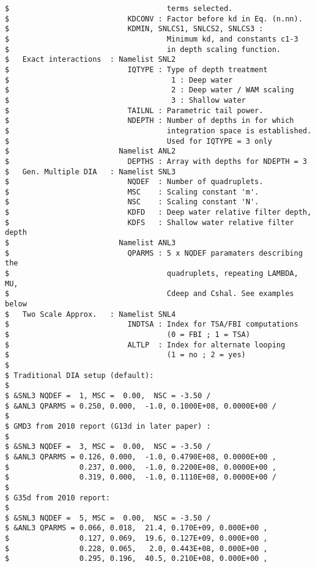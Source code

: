 \begin{footnotesize}
\begin{verbatim}
$                                    terms selected.
$                           KDCONV : Factor before kd in Eq. (n.nn).
$                           KDMIN, SNLCS1, SNLCS2, SNLCS3 :
$                                    Minimum kd, and constants c1-3
$                                    in depth scaling function.
$   Exact interactions  : Namelist SNL2
$                           IQTYPE : Type of depth treatment
$                                     1 : Deep water
$                                     2 : Deep water / WAM scaling
$                                     3 : Shallow water
$                           TAILNL : Parametric tail power.
$                           NDEPTH : Number of depths in for which
$                                    integration space is established.
$                                    Used for IQTYPE = 3 only
$                         Namelist ANL2
$                           DEPTHS : Array with depths for NDEPTH = 3
$   Gen. Multiple DIA   : Namelist SNL3
$                           NQDEF  : Number of quadruplets.
$                           MSC    : Scaling constant 'm'.
$                           NSC    : Scaling constant 'N'.
$                           KDFD   : Deep water relative filter depth,
$                           KDFS   : Shallow water relative filter depth
$                         Namelist ANL3
$                           QPARMS : 5 x NQDEF paramaters describing the
$                                    quadruplets, repeating LAMBDA, MU, 
$                                    Cdeep and Cshal. See examples below
$   Two Scale Approx.   : Namelist SNL4
$                           INDTSA : Index for TSA/FBI computations
$                                    (0 = FBI ; 1 = TSA)
$                           ALTLP  : Index for alternate looping
$                                    (1 = no ; 2 = yes)
$
$ Traditional DIA setup (default):
$
$ &SNL3 NQDEF =  1, MSC =  0.00,  NSC = -3.50 /
$ &ANL3 QPARMS = 0.250, 0.000,  -1.0, 0.1000E+08, 0.0000E+00 /
$
$ GMD3 from 2010 report (G13d in later paper) :
$
$ &SNL3 NQDEF =  3, MSC =  0.00,  NSC = -3.50 /
$ &ANL3 QPARMS = 0.126, 0.000,  -1.0, 0.4790E+08, 0.0000E+00 ,
$                0.237, 0.000,  -1.0, 0.2200E+08, 0.0000E+00 ,
$                0.319, 0.000,  -1.0, 0.1110E+08, 0.0000E+00 /
$
$ G35d from 2010 report:
$
$ &SNL3 NQDEF =  5, MSC =  0.00,  NSC = -3.50 /
$ &ANL3 QPARMS = 0.066, 0.018,  21.4, 0.170E+09, 0.000E+00 ,
$                0.127, 0.069,  19.6, 0.127E+09, 0.000E+00 ,
$                0.228, 0.065,   2.0, 0.443E+08, 0.000E+00 ,
$                0.295, 0.196,  40.5, 0.210E+08, 0.000E+00 ,

\end{verbatim}
\end{footnotesize}
